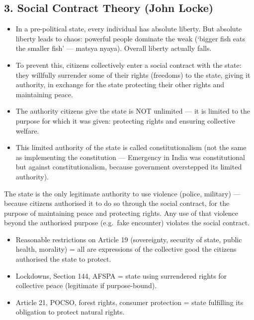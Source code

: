 \subsection*{3. Social Contract Theory (John Locke)}
\begin{KeyConcept}
\begin{itemize}
\item In a pre-political state, every individual has absolute liberty. But absolute liberty leads to chaos: powerful people dominate the weak (`bigger fish eats the smaller fish' --- matsya nyaya). Overall liberty actually falls.
\item To prevent this, citizens collectively enter a social contract with the state: they willfully surrender some of their rights (freedoms) to the state, giving it authority, in exchange for the state protecting their other rights and maintaining peace.
\item The authority citizens give the state is NOT unlimited --- it is limited to the purpose for which it was given: protecting rights and ensuring collective welfare.
\item This limited authority of the state is called constitutionalism (not the same as implementing the constitution --- Emergency in India was constitutional but against constitutionalism, because government overstepped its limited authority).
\end{itemize}
\end{KeyConcept}

\begin{CriticalPoint}
The state is the only legitimate authority to use violence (police, military) --- because citizens authorised it to do so through the social contract, for the purpose of maintaining peace and protecting rights. Any use of that violence beyond the authorised purpose (e.g.\ fake encounter) violates the social contract.
\end{CriticalPoint}

\begin{GovtPolicy}
\begin{itemize}
\item Reasonable restrictions on Article 19 (sovereignty, security of state, public health, morality) = all are expressions of the collective good the citizens authorised the state to protect.
\item Lockdowns, Section 144, AFSPA = state using surrendered rights for collective peace (legitimate if purpose-bound).
\item Article 21, POCSO, forest rights, consumer protection = state fulfilling its obligation to protect natural rights.
\end{itemize}
\end{GovtPolicy}

